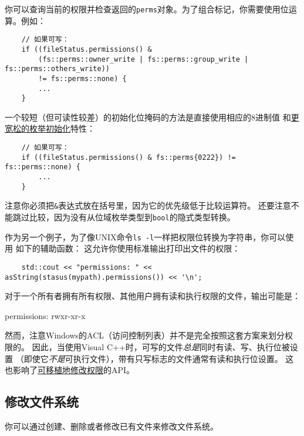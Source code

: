 你可以查询当前的权限并检查返回的\texttt{perms}对象。为了组合标记，你需要使用位运算。例如：
\begin{lstlisting}
    // 如果可写：
    if ((fileStatus.permissions() &
        (fs::perms::owner_write | fs::perms::group_write | fs::perms::others_write))
        != fs::perms::none) {
        ...
    }
\end{lstlisting}
一个较短（但可读性较差）的初始化位掩码的方法是直接使用相应的8进制值
和\hyperref[ch8.3]{更宽松的枚举初始化}特性：
\begin{lstlisting}
    // 如果可写：
    if ((fileStatus.permissions() & fs::perms{0222}) != fs::perms::none) {
        ...
    }
\end{lstlisting}
注意你必须把\texttt{\&}表达式放在括号里，因为它的优先级低于比较运算符。
还要注意不能跳过比较，因为没有从位域枚举类型到\texttt{bool}的隐式类型转换。

作为另一个例子，为了像UNIX命令\texttt{ls -l}一样把权限位转换为字符串，你可以使用
如下的辅助函数：
这允许你使用标准输出打印出文件的权限：
\begin{lstlisting}
    std::cout << "permissions: " << asString(stasus(mypath).permissions()) << '\n';
\end{lstlisting}
对于一个所有者拥有所有权限、其他用户拥有读和执行权限的文件，输出可能是：
\begin{blacklisting}
    permissions: rwxr-xr-x
\end{blacklisting}
然而，注意Windows的ACL（访问控制列表）并不是完全按照这套方案来划分权限的。
因此，当使用Visual C++时，可写的文件\emph{总是}同时有读、写、执行位被设置
（即使它\emph{不是}可执行文件），带有只写标志的文件通常有读和执行位设置。
这也影响了\hyperref[可移植的修改权限]{可移植地修改权限}的API。\label{ACL}

\subsection{修改文件系统}
你可以通过创建、删除或者修改已有文件来修改文件系统。

